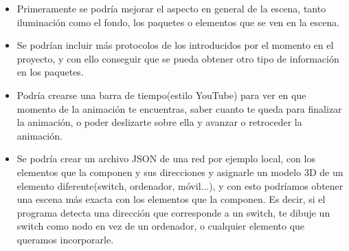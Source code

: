 \documentclass[a4paper, 12pt]{book}
\begin{document}
\begin{itemize}
    \item Primeramente se podría mejorar el aspecto en general de la escena, tanto iluminación como el fondo, los paquetes o elementos que se ven en la escena.
    
    \item Se podrían incluir más protocolos de los introducidos por el momento en el proyecto, y con ello conseguir que se pueda obtener otro tipo de información en los paquetes.
    
    \item Podría crearse una barra de tiempo(estilo YouTube) para ver en que momento de la animación te encuentras, saber cuanto te queda para finalizar la animación, o poder deslizarte sobre ella y avanzar o retroceder la animación.
    
    \item Se podría crear un archivo JSON de una red por ejemplo local, con los elementos que la componen y sus direcciones y asignarle un modelo 3D de un elemento diferente(switch, ordenador, móvil...), y con esto podríamos obtener una escena más exacta con los elementos que la componen. Es decir, si el programa detecta una dirección que corresponde a un switch, te dibuje un switch como nodo en vez de un ordenador, o cualquier elemento que queramos incorporarle.
\end{itemize}



\cleardoublepage




\nocite{A-Frame}

\nocite{A-Framewidgets}

\nocite{A-Framegui}

\nocite{TimeInterval}

\nocite{Timer}

\nocite{Aframe-playground}

\nocite{overleaf}

\nocite{event}

\nocite{}
\end{document}
